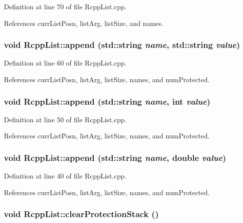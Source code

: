Definition at line 70 of file RcppList.cpp.

References currListPosn, listArg, listSize, and names.\hypertarget{classRcppList_a896d405a8a82cd6b5b9eaf2976bc54d6}{
\subsubsection[{append}]{\setlength{\rightskip}{0pt plus 5cm}void RcppList::append (std::string {\em name}, \/  std::string {\em value})}}
\label{classRcppList_a896d405a8a82cd6b5b9eaf2976bc54d6}


Definition at line 60 of file RcppList.cpp.

References currListPosn, listArg, listSize, names, and numProtected.\hypertarget{classRcppList_a129144193234d87bcba6aed3acf53254}{
\subsubsection[{append}]{\setlength{\rightskip}{0pt plus 5cm}void RcppList::append (std::string {\em name}, \/  int {\em value})}}
\label{classRcppList_a129144193234d87bcba6aed3acf53254}


Definition at line 50 of file RcppList.cpp.

References currListPosn, listArg, listSize, names, and numProtected.\hypertarget{classRcppList_a259b0c48d68d995bcd906b8c1e8c970a}{
\subsubsection[{append}]{\setlength{\rightskip}{0pt plus 5cm}void RcppList::append (std::string {\em name}, \/  double {\em value})}}
\label{classRcppList_a259b0c48d68d995bcd906b8c1e8c970a}


Definition at line 40 of file RcppList.cpp.

References currListPosn, listArg, listSize, names, and numProtected.\hypertarget{classRcppList_a164577340e23dd0811fc7057aa9aedec}{
\subsubsection[{clearProtectionStack}]{\setlength{\rightskip}{0pt plus 5cm}void RcppList::clearProtectionStack ()}}
\label{classRcppList_a164577340e23dd0811fc7057aa9aedec}


